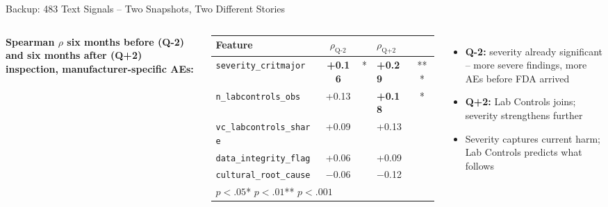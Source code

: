 \documentclass[aspectratio=169,10pt]{beamer}
\newcommand{\tech}[1]{{\color{techBlue}\textbf{#1}}}
\begin{document}
\begin{frame}{Backup: 483 Text Signals -- Two Snapshots, Two Different Stories}
\begin{columns}[T]
\textbf{Spearman $\rho$ six months before (Q-2) and six months after (Q+2) inspection, manufacturer-specific AEs:}

\vspace{4pt}
{\small
\begin{tabular}{lcclc}
\toprule
Feature & $\rho_{\text{Q-2}}$ & & $\rho_{\text{Q+2}}$ & \\
\midrule
\texttt{severity\_critmajor}    & \tech{+0.16} & *   & \tech{+0.29} & *** \\
\texttt{n\_labcontrols\_obs}    & +0.13 &     & \tech{+0.18} & *   \\
\texttt{vc\_labcontrols\_share} & +0.09 &     & +0.13        &     \\
\texttt{data\_integrity\_flag}  & +0.06 &     & +0.09        &     \\
\midrule
\texttt{cultural\_root\_cause}  & $-$0.06 &   & $-$0.12      &     \\
\bottomrule
\multicolumn{5}{l}{\scriptsize * $p{<}.05$\quad ** $p{<}.01$\quad *** $p{<}.001$}
\end{tabular}
}

\hfill{}
\begin{itemize}
  \setlength{\itemsep}{8pt}
  \item \textbf{Q-2:} severity already significant -- more severe findings, more AEs before FDA arrived
  \item \textbf{Q+2:} Lab Controls joins; severity strengthens further
  \item Severity captures current harm; Lab Controls predicts what follows
\end{itemize}
\end{columns}
\end{frame}
\end{document}
